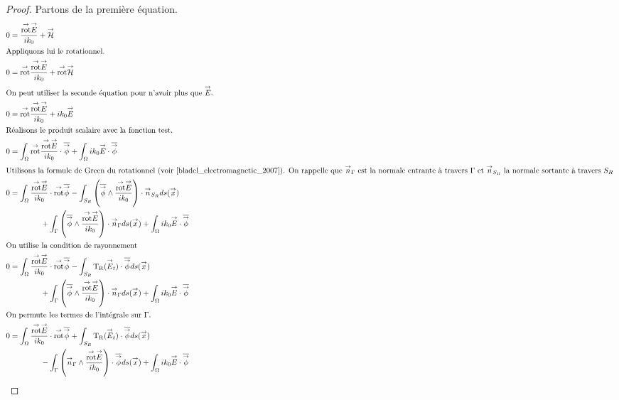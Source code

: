   \begin{proof}
    Partons de la première équation.
    \begin{align}
          0 & = \frac{\trot \vE}{ik_0} + \vH
          \\ \intertext{Appliquons lui le rotationnel.}
          0 & = \trot \frac{\trot \vE}{ik_0} + \trot \vH
          \\ \intertext{On peut utiliser la seconde équation pour n'avoir plus que \(\vE\).}
          0 & = \trot \frac{\trot \vE}{ik_0} + ik_0 \vE
          \\ \intertext{Réalisons le produit scalaire avec la fonction test.}
          0 & = \int_\OO{ \trot \frac{\trot \vE}{ik_0}\cdot \conj{\vect{\phi}}} +  \int_\OO ik_0 \vE \cdot \conj{\vect{\phi}}
          \\ \intertext{Utilisons la formule de Green du rotationnel (voir \cite[eq.~(A1.32)]{bladel_electromagnetic_2007}). On rappelle que \(\vn_\Gamma\) est la normale entrante à travers \(\Gamma\) et \(\vn_{S_R}\) la normale sortante à travers \(S_R\) }
          0 & = \int_\OO{ \frac{\trot \vE}{ik_0}\cdot \trot \conj{\vect{\phi}}} - \int_{S_R} \left( \conj{\vect \phi} \pvect \frac{\trot \vE}{ik_0}\right)  \cdot \vn_{S_R} ds(\vx) 
          \\ \notag
          & \qquad \qquad + \int_\Gamma \left( \conj{\vect \phi} \pvect \frac{\trot \vE}{ik_0}\right)  \cdot \vn_\Gamma ds(\vx) + \int_\OO ik_0 \vE \cdot \conj{\vect{\phi}}
          \\ \intertext{On utilise la condition de rayonnement}
          0 & = \int_\OO{ \frac{\trot \vE}{ik_0}\cdot \trot \conj{\vect{\phi}}} - \int_{S_R} \Tr(\vE_t)  \cdot \conj{\vect{\phi}} ds(\vx) 
          \\ \notag
          & \qquad \qquad + \int_\Gamma \left( \conj{\vect \phi} \pvect \frac{\trot \vE}{ik_0}\right)  \cdot \vn_\Gamma ds(\vx) + \int_\OO ik_0 \vE \cdot \conj{\vect{\phi}}
          \\ \intertext{On permute les termes de l'intégrale sur \(\Gamma\).}
          0 & = \int_\OO \frac{\trot \vE}{ik_0}\cdot \trot \conj{\vect{\phi}} + \int_{S_R} \Tr(\vE_t)  \cdot \conj{\vect{\phi}} ds(\vx) 
          \\ \notag
          & \qquad \qquad - \int_\Gamma \left(\vn_\Gamma \pvect \frac{\trot \vE}{ik_0}\right) \cdot \conj{\vect \phi} ds(\vx) +  \int_\OO ik_0 \vE \cdot \conj{\vect{\phi}}
      \end{align}
  \end{proof}

